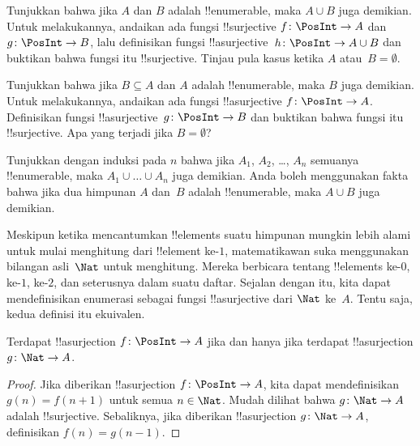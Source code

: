\documentclass[../../../include/open-logic-section]{subfiles}
\begin{document}
\begin{prob}
  Tunjukkan bahwa jika $A$ dan $B$ adalah !!{enumerable}, maka $A \cup B$ juga
  demikian. Untuk melakukannya, andaikan ada fungsi !!{surjective} $f\colon
  \PosInt \to A$ dan $g\colon \PosInt \to B$, lalu definisikan fungsi
  !!a{surjective}~$h\colon \PosInt \to A \cup B$ dan buktikan bahwa fungsi itu
  !!{surjective}. Tinjau pula kasus ketika $A$ atau~$B = \emptyset$.
\end{prob}

\begin{prob}
  Tunjukkan bahwa jika $B \subseteq A$ dan $A$ adalah !!{enumerable}, maka $B$
  juga demikian. Untuk melakukannya, andaikan ada fungsi !!a{surjective}
  $f\colon \PosInt \to A$. Definisikan fungsi !!a{surjective}~$g\colon
  \PosInt \to B$ dan buktikan bahwa fungsi itu !!{surjective}. Apa yang
  terjadi jika $B = \emptyset$?
\end{prob}

\begin{prob}
  Tunjukkan dengan induksi pada $n$ bahwa jika $A_1$, $A_2$, \dots, $A_n$
  semuanya !!{enumerable}, maka $A_1 \cup \dots \cup A_n$ juga demikian. Anda
  boleh menggunakan fakta bahwa jika dua himpunan $A$ dan~$B$ adalah
  !!{enumerable}, maka $A \cup B$ juga demikian.
\end{prob}

Meskipun ketika mencantumkan !!{element}s suatu himpunan mungkin lebih alami
untuk mulai menghitung dari !!{element} ke-$1$, matematikawan suka menggunakan
bilangan asli~$\Nat$ untuk menghitung. Mereka berbicara tentang !!{element}s
ke-$0$, ke-$1$, ke-$2$, dan seterusnya dalam suatu daftar. Sejalan dengan itu,
kita dapat mendefinisikan enumerasi sebagai fungsi !!a{surjective} dari $\Nat$
ke~$A$. Tentu saja, kedua definisi itu ekuivalen.

\begin{prop}
  Terdapat !!a{surjection} $f\colon \PosInt \to A$ jika dan hanya jika
  terdapat !!a{surjection} $g\colon \Nat \to A$.
\end{prop}

\begin{proof}
  Jika diberikan !!a{surjection} $f\colon \PosInt \to A$, kita dapat
  mendefinisikan $g(n) = f(n+1)$ untuk semua $n \in \Nat$. Mudah dilihat bahwa
  $g\colon \Nat \to A$ adalah !!{surjective}. Sebaliknya, jika diberikan
  !!a{surjection} $g\colon \Nat \to A$, definisikan $f(n) = g(n-1)$.
\end{proof}
\end{document}
